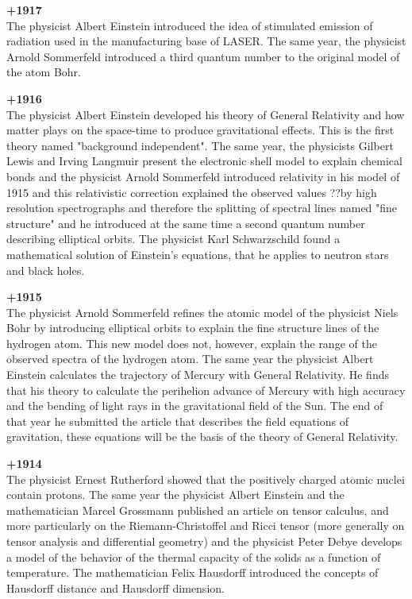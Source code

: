 \textbf{+1917}\\
The physicist Albert Einstein introduced the idea of stimulated emission of radiation used in the manufacturing base of LASER. The same year, the physicist Arnold Sommerfeld introduced a third quantum number to the original model of the atom Bohr.

\textbf{+1916}\\
The physicist Albert Einstein developed his theory of General Relativity and how matter plays on the space-time to produce gravitational effects. This is the first theory named "background independent". The same year, the physicists Gilbert Lewis and Irving Langmuir present the electronic shell model to explain chemical bonds and the physicist Arnold Sommerfeld introduced relativity in his model of 1915 and this relativistic correction explained the observed values ??by high resolution spectrographs and therefore the splitting of spectral lines named "fine structure" and he introduced at the same time a second quantum number describing elliptical orbits. The physicist Karl Schwarzschild found a mathematical solution of Einstein's equations, that he applies to neutron stars and black holes.

\textbf{+1915}\\
The physicist Arnold Sommerfeld refines the atomic model of the physicist Niels Bohr by introducing elliptical orbits to explain the fine structure lines of the hydrogen atom. This new model does not, however, explain the range of the observed spectra of the hydrogen atom. The same year the physicist Albert Einstein calculates the trajectory of Mercury with General Relativity. He finds that his theory to calculate the perihelion advance of Mercury with high accuracy and the bending of light rays in the gravitational field of the Sun. The end of that year he submitted the article that describes the field equations of gravitation, these equations will be the basis of the theory of General Relativity.

\textbf{+1914}\\
The physicist Ernest Rutherford showed that the positively charged atomic nuclei contain protons. The same year the physicist Albert Einstein and the mathematician Marcel Grossmann published an article on tensor calculus, and more particularly on the Riemann-Christoffel and Ricci tensor (more generally on tensor analysis and differential geometry) and the physicist Peter Debye develops a model of the behavior of the thermal capacity of the solids as a function of temperature. The mathematician Felix Hausdorff introduced the concepts of Hausdorff distance and Hausdorff dimension.

